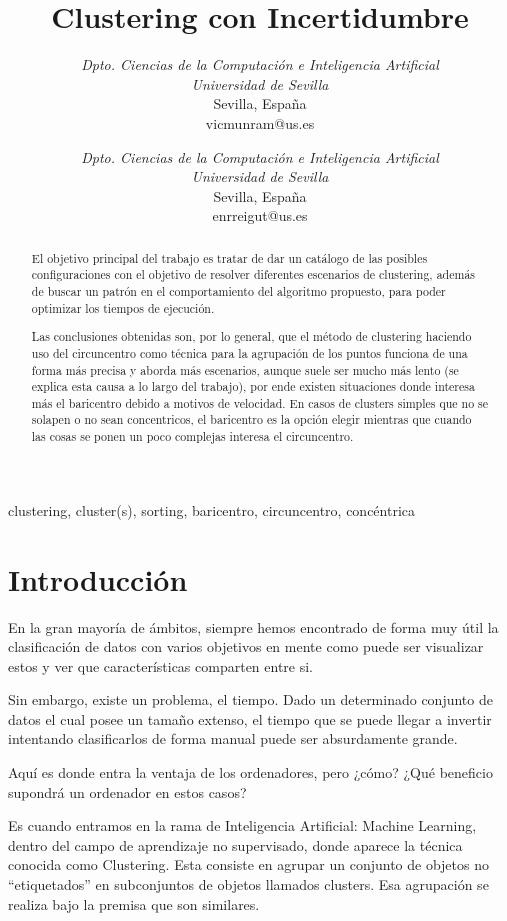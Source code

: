 \documentclass[conference,a4paper]{IEEEtran}
\title{Clustering con Incertidumbre}
\author
{
	\IEEEauthorblockN{Víctor Muñoz Ramírez}
	\IEEEauthorblockA
	{
		\textit{Dpto. Ciencias de la Computación e Inteligencia Artificial}\\
		\textit{Universidad de Sevilla}\\
		Sevilla, España\\
		vicmunram@us.es
	}
	\and	
	\IEEEauthorblockN{Enrique Reina Gutiérrez}
	\IEEEauthorblockA
	{
		\textit{Dpto. Ciencias de la Computación e Inteligencia Artificial}\\
		\textit{Universidad de Sevilla}\\
		Sevilla, España\\
		enrreigut@us.es
	}
}
\begin{document}
\maketitle


\begin{abstract}
El objetivo principal del trabajo es tratar de dar un catálogo de las posibles configuraciones con el objetivo de resolver diferentes escenarios de clustering, además de buscar un patrón en el comportamiento del algoritmo propuesto, para poder optimizar los tiempos de ejecución.

Las conclusiones obtenidas son, por lo general, que el método de clustering haciendo uso del circuncentro como técnica para la agrupación de los puntos funciona de una forma más precisa y aborda más escenarios, aunque suele ser mucho más lento (se explica esta causa a lo largo del trabajo), por ende existen situaciones donde interesa más el baricentro debido a motivos de velocidad. En casos de clusters simples que no se solapen o no sean concentricos, el baricentro es la opción elegir mientras que cuando las cosas se ponen un poco complejas interesa el circuncentro.
\end{abstract}

\begin{IEEEkeywords}
clustering, cluster(s), sorting, baricentro, circuncentro, concéntrica
\end{IEEEkeywords}

\section{Introducción}

En la gran mayoría de ámbitos, siempre hemos encontrado de forma muy útil la clasificación de datos con varios objetivos en mente como puede ser visualizar estos y ver que características comparten entre si.

Sin embargo, existe un problema, el tiempo. Dado un determinado conjunto de datos el cual posee un tamaño extenso, el tiempo que se puede llegar a invertir intentando clasificarlos de forma manual puede ser absurdamente grande.

Aquí es donde entra la ventaja de los ordenadores, pero ¿cómo? ¿Qué beneficio supondrá un ordenador en estos casos? 

Es cuando entramos en la rama de Inteligencia Artificial: Machine Learning, dentro del campo de aprendizaje no supervisado, donde aparece la técnica conocida como Clustering. Esta consiste en agrupar un conjunto de objetos no “etiquetados” en subconjuntos de objetos llamados clusters. Esa agrupación se realiza bajo la premisa que son similares.
\end{document}
